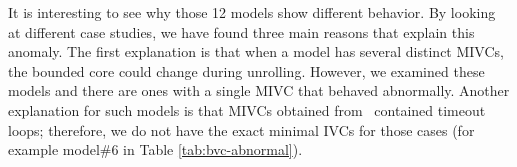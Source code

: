       It is interesting to see why those 12 models show different behavior. By looking at different case studies, we have found three main reasons that explain this anomaly.  The first explanation is that when a model has several distinct MIVCs, the bounded core could change during unrolling. However, we examined these models and there are ones with a single MIVC that behaved abnormally. Another explanation for such models is that MIVCs obtained from \aivcalg ~contained timeout loops; therefore, we do not have the exact minimal IVCs for those cases (for example model\#6 in Table \ref{tab:bvc-abnormal}).







